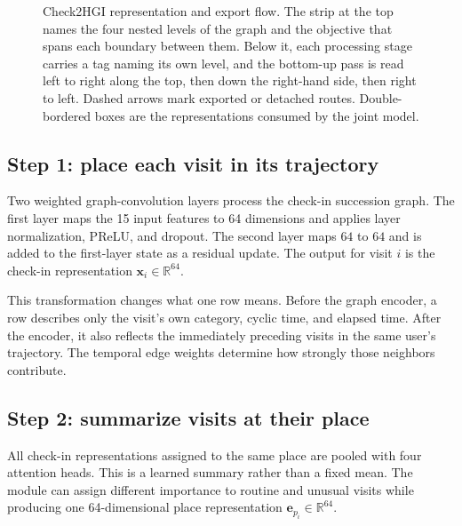 \begin{figure}[H]
    \centering
    
    \caption{Check2HGI representation and export flow. The strip at the top names the
    four nested levels of the graph and the objective that spans each boundary between
    them. Below it, each processing stage carries a tag naming its own level, and the
    bottom-up pass is read left to right along the top, then down the right-hand side,
    then right to left. Dashed arrows mark exported or detached routes. Double-bordered
    boxes are the representations consumed by the joint model.}
    \label{fig:apx-check2hgi-flow}
\end{figure}

\subsection{Step 1: place each visit in its trajectory}

Two weighted graph-convolution layers process the check-in succession graph. The
first layer maps the 15 input features to 64 dimensions and applies layer
normalization, PReLU, and dropout. The second layer maps $64$ to $64$ and is added
to the first-layer state as a residual update. The output for visit $i$ is the
check-in representation $\mathbf{x}_i\in\mathbb{R}^{64}$.

This transformation changes what one row means. Before the graph encoder, a row
describes only the visit's own category, cyclic time, and elapsed time. After the
encoder, it also reflects the immediately preceding visits in the same user's
trajectory. The temporal edge weights determine how strongly those neighbors
contribute.

\subsection{Step 2: summarize visits at their place}

All check-in representations assigned to the same place are pooled with four
attention heads. This is a learned summary rather than a fixed mean. The module can
assign different importance to routine and unusual visits while producing one
64-dimensional place representation $\mathbf{e}_{p_i}\in\mathbb{R}^{64}$.

